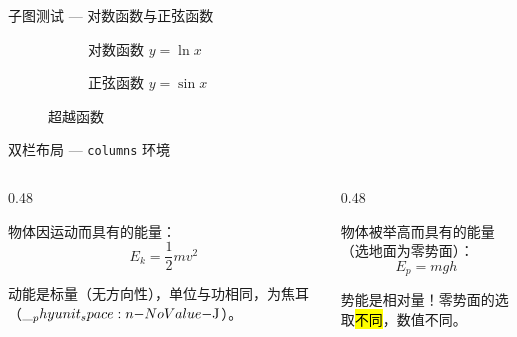 \documentclass[darkmode=false, randomquote=true, quoteseed=2026, shownav=false,handout=false]{HiBeamer}
\begin{document}
\begin{frame}{子图测试 --- 对数函数与正弦函数}
  \begin{figure}
    \centering
    \begin{subfigure}[b]{0.45\textwidth}
      \centering
      \caption{对数函数 $y = \ln x$}
    \end{subfigure}
    \begin{subfigure}[b]{0.45\textwidth}
      \centering
      \caption{正弦函数 $y = \sin x$}
    \end{subfigure}
    \caption{超越函数}
  \end{figure}
\end{frame}

\begin{frame}{双栏布局 --- \texttt{columns} 环境}
  \begin{columns}[T]
    \begin{column}{0.48\linewidth}
      \begin{defn}[动能]
        物体因运动而具有的能量：
        \begin{equation}
          E_k = \frac{1}{2}mv^2
        \end{equation}
      \end{defn}

      \begin{tip}
        动能是标量（无方向性），单位与功相同，为焦耳（$\UJ$）。
      \end{tip}
    \end{column}

    \begin{column}{0.48\linewidth}
      \begin{defn}[重力势能]
        物体被举高而具有的能量（选地面为零势面）：
        \begin{equation}
          E_p = mgh
        \end{equation}
      \end{defn}

      \begin{warn}
        势能是相对量！零势面的选取\hl{不同}，数值不同。
      \end{warn}
    \end{column}
  \end{columns}
\end{frame}
\end{document}
